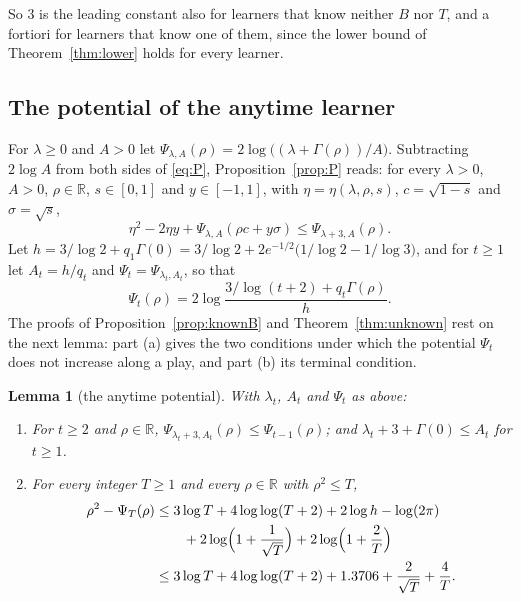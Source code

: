 \documentclass[12pt]{amsart}
\newtheorem{lemma}[theorem]{Lemma}
\theoremstyle{definition}
\numberwithin{equation}{section}
\newcommand{\R}{\mathbb{R}}
\newcommand{\leanmap}[1]{\ignorespaces}
\newcommand{\mapnote}[1]{\ignorespaces}
\begin{document}
So $3$ is the leading constant also for learners that know neither $B$ nor $T$, and a fortiori for learners that know one of them, since the lower bound of Theorem~\ref{thm:lower} holds for every learner.

\subsection{The potential of the anytime learner}
For $\lambda\ge0$ and $A>0$ let $\Psi_{\lambda,A}(\rho)=2\log\bigl((\lambda+\Gamma(\rho))/A\bigr)$. Subtracting $2\log A$ from both sides of \eqref{eq:P}, Proposition~\ref{prop:P} reads: for every $\lambda>0$, $A>0$, $\rho\in\R$, $s\in[0,1]$ and $y\in[-1,1]$, with $\eta=\eta(\lambda,\rho,s)$, $c=\sqrt{1-s}$ and $\sigma=\sqrt s$,
\begin{equation}\label{eq:PA}
\eta^2-2\eta y+\Psi_{\lambda,A}(\rho c+y\sigma)\le\Psi_{\lambda+3,A}(\rho) .
\end{equation}
Let $h=3/\log2+q_1\Gamma(0)=3/\log2+2e^{-1/2}\bigl(1/\log2-1/\log3\bigr)$, and for $t\ge1$ let $A_t=h/q_t$ and $\Psi_t=\Psi_{\lambda_t,A_t}$, so that
\[
\Psi_t(\rho)=2\log\frac{3/\log(t+2)+q_t\Gamma(\rho)}{h} .
\]
The proofs of Proposition~\ref{prop:knownB} and Theorem~\ref{thm:unknown} rest on the next lemma: part (a) gives the two conditions under which the potential $\Psi_t$ does not increase along a play, and part (b) its terminal condition.

\begin{lemma}[the anytime potential]\label{lem:anytime}
\leanmap{RegretKappa.UnknownBT.LT_le_num, RegretKappa.UnknownBT.isSchedule_B, RegretKappa.UnknownBT.psiOf_B,
  RegretKappa.UnknownBT.LT_le_first, RegretKappa.UnknownBT.terminal_anytime}
\mapnote{(a) is \lname{RegretKappa.UnknownBT.IsSchedule} for \lname{RegretKappa.UnknownBT.lamB} and \lname{RegretKappa.UnknownBT.AB}, with rounds indexed from $0$: $\lambda_t$ and $A_t$ are the values at $t-1$; $\Psi_t$ is \lname{RegretKappa.UnknownBT.psiOf} at $t-1$.}
With $\lambda_t$, $A_t$ and $\Psi_t$ as above:
\begin{enumerate}
\item[(a)] For $t\ge2$ and $\rho\in\R$, $\Psi_{\lambda_t+3,A_t}(\rho)\le\Psi_{t-1}(\rho)$; and $\lambda_t+3+\Gamma(0)\le A_t$ for $t\ge1$.
\item[(b)] For every integer $T\ge1$ and every $\rho\in\R$ with $\rho^2\le T$,
\begin{align*}
\rho^2-\Psi_T(\rho)&\le3\log T+4\log\log(T+2)+2\log h-\log(2\pi)\\
&\qquad+2\log\Bigl(1+\frac1{\sqrt T}\Bigr)+2\log\Bigl(1+\frac2T\Bigr)\\
&\le3\log T+4\log\log(T+2)+1.3706+\frac2{\sqrt T}+\frac4T .
\end{align*}
\end{enumerate}
\end{lemma}
\end{document}
